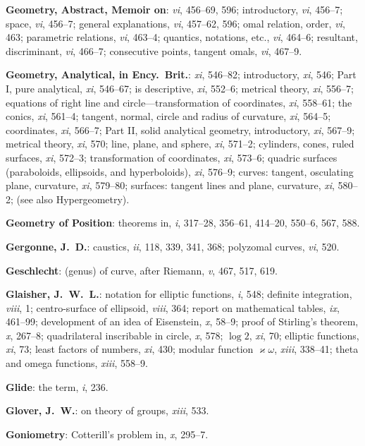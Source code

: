 \documentclass[11pt,a4paper]{article}
\newcommand{\IndexEntry}[1]{\textbf{#1}}
\newcommand{\V}[1]{\textit{#1}} %
\begin{document}
\IndexEntry{Geometry, Abstract, Memoir on}: \V{vi}, 456--69, 596; introductory, \V{vi}, 456--7; space, \V{vi}, 456--7; general explanations, \V{vi}, 457--62, 596; omal relation, order, \V{vi}, 463; parametric relations, \V{vi}, 463--4; quantics, notations, etc., \V{vi}, 464--6; resultant, discriminant, \V{vi}, 466--7; consecutive points, tangent omals, \V{vi}, 467--9.

\IndexEntry{Geometry, Analytical, in Ency.\ Brit.}: \V{xi}, 546--82; introductory, \V{xi}, 546; Part I, pure analytical, \V{xi}, 546--67; is descriptive, \V{xi}, 552--6; metrical theory, \V{xi}, 556--7; equations of right line and circle---transformation of coordinates, \V{xi}, 558--61; the conics, \V{xi}, 561--4; tangent, normal, circle and radius of curvature, \V{xi}, 564--5; coordinates, \V{xi}, 566--7; Part II, solid analytical geometry, introductory, \V{xi}, 567--9; metrical theory, \V{xi}, 570; line, plane, and sphere, \V{xi}, 571--2; cylinders, cones, ruled surfaces, \V{xi}, 572--3; transformation of coordinates, \V{xi}, 573--6; quadric surfaces (paraboloids, ellipsoids, and hyperboloids), \V{xi}, 576--9; curves: tangent, osculating plane, curvature, \V{xi}, 579--80; surfaces: tangent lines and plane, curvature, \V{xi}, 580--2; (see also Hypergeometry).

\IndexEntry{Geometry of Position}: theorems in, \V{i}, 317--28, 356--61, 414--20, 550--6, 567, 588.

\IndexEntry{Gergonne, J.\ D.}: caustics, \V{ii}, 118, 339, 341, 368; polyzomal curves, \V{vi}, 520.

\IndexEntry{Geschlecht}: (genus) of curve, after Riemann, \V{v}, 467, 517, 619.

\IndexEntry{Glaisher, J.\ W.\ L.}: notation for elliptic functions, \V{i}, 548; definite integration, \V{viii}, 1; centro-surface of ellipsoid, \V{viii}, 364; report on mathematical tables, \V{ix}, 461--99; development of an idea of Eisenstein, \V{x}, 58--9; proof of Stirling's theorem, \V{x}, 267--8; quadrilateral inscribable in circle, \V{x}, 578; $\log 2$, \V{xi}, 70; elliptic functions, \V{xi}, 73; least factors of numbers, \V{xi}, 430; modular function $\varkappa\omega$, \V{xiii}, 338--41; theta and omega functions, \V{xiii}, 558--9.

\IndexEntry{Glide}: the term, \V{i}, 236.

\IndexEntry{Glover, J.\ W.}: on theory of groups, \V{xiii}, 533.

\IndexEntry{Goniometry}: Cotterill's problem in, \V{x}, 295--7.
\end{document}
